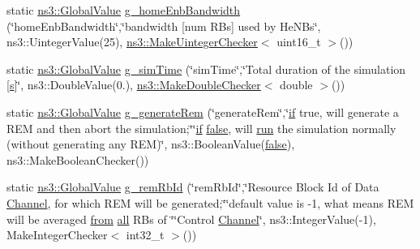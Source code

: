 \begin{DoxyCompactItemize}
\item 
static \hyperlink{classns3_1_1GlobalValue}{ns3\+::\+Global\+Value} \hyperlink{lena-dual-stripe_8cc_a80f8c4c7cba662b86948cf8f72b0b488}{g\+\_\+home\+Enb\+Bandwidth} (\char`\"{}home\+Enb\+Bandwidth\char`\"{},\char`\"{}bandwidth \mbox{[}num R\+Bs\mbox{]} used by He\+N\+Bs\char`\"{}, ns3\+::\+Uinteger\+Value(25), \hyperlink{namespacens3_aed274764da411ed9397a3524a7c9abb8}{ns3\+::\+Make\+Uinteger\+Checker}$<$ uint16\+\_\+t $>$())
\item 
static \hyperlink{classns3_1_1GlobalValue}{ns3\+::\+Global\+Value} \hyperlink{lena-dual-stripe_8cc_abf302f6fd76a1dd9d34b22b9999f204a}{g\+\_\+sim\+Time} (\char`\"{}sim\+Time\char`\"{},\char`\"{}Total duration of the simulation \mbox{[}\hyperlink{generate__test__data__lte__sinr_8m_ad83eeb3a142285d1243a08c6b7026df8}{s}\mbox{]}\char`\"{}, ns3\+::\+Double\+Value(0.), \hyperlink{namespacens3_a0f8000e7b66dd988358648f0b16c7709}{ns3\+::\+Make\+Double\+Checker}$<$ double $>$())
\item 
static \hyperlink{classns3_1_1GlobalValue}{ns3\+::\+Global\+Value} \hyperlink{lena-dual-stripe_8cc_adba21d6e97a6ffcddb4647699de367eb}{g\+\_\+generate\+Rem} (\char`\"{}generate\+Rem\char`\"{},\char`\"{}\hyperlink{loss__OH__large__cities__urban_8m_ac77b6cfa3068152087725fe54b4ae8c8}{if} true, will generate a R\+EM and then abort the simulation;\char`\"{}\char`\"{}\hyperlink{loss__OH__large__cities__urban_8m_ac77b6cfa3068152087725fe54b4ae8c8}{if} \hyperlink{lte__cqi__generation_8m_ab1bef239d413c4da139c4bac92cd657a}{false}, will \hyperlink{generate__test__data__lte__spectrum__value__txpsd_8m_a093eaf8ac95b223aafb28e4668160d1f}{run} the simulation normally (without generating any R\+EM)\char`\"{}, ns3\+::\+Boolean\+Value(\hyperlink{lte__cqi__generation_8m_ab1bef239d413c4da139c4bac92cd657a}{false}), ns3\+::\+Make\+Boolean\+Checker())
\item 
static \hyperlink{classns3_1_1GlobalValue}{ns3\+::\+Global\+Value} \hyperlink{lena-dual-stripe_8cc_a7601ae78904d09cb834dafbebec56384}{g\+\_\+rem\+Rb\+Id} (\char`\"{}rem\+Rb\+Id\char`\"{},\char`\"{}Resource Block Id of Data \hyperlink{classns3_1_1Channel}{Channel}, for which R\+EM will be generated;\char`\"{}\char`\"{}default value is -\/1, what means R\+EM will be averaged \hyperlink{lte__amc_8m_a1b4c81ff74eb1a626b5ade44c81004b3}{from} \hyperlink{mmwave_2model_2fading-traces_2fading__trace__generator_8m_a00a349297fa58bc80ff5329e25dcfe28}{all} R\+Bs of \char`\"{}\char`\"{}Control \hyperlink{classns3_1_1Channel}{Channel}\char`\"{}, ns3\+::\+Integer\+Value(-\/1), Make\+Integer\+Checker$<$ int32\+\_\+t $>$())

\end{DoxyCompactItemize}
